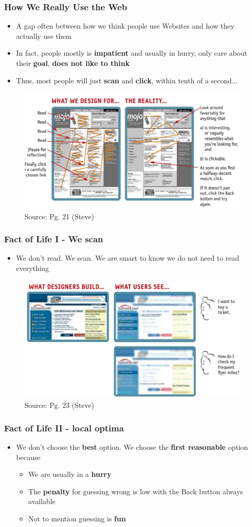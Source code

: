\documentclass{beamer}
\begin{document}
\begin{frame}
	\frametitle{How We Really Use the Web}
	\begin{itemize}
		\item A gap often between how we think people use Websites and how they actually use them
		\item In fact, people mostly is \textbf{impatient} and usually in hurry, only care about their \textbf{goal}, \textbf{does not like to think}
		\item Thus, most people will just \textbf{scan} and \textbf{click}, within tenth of a second...
	\end{itemize}
		\begin{figure}
		\includegraphics[width=0.5\linewidth]{steve/how}
		\caption{Source: Pg. 21 (Steve)}
	\end{figure}
\end{frame}

\begin{frame}
	\frametitle{Fact of Life I - We scan}
	\begin{itemize}
		\item We don't read.  We scan.  We are smart to know we do not need to read everything
	\end{itemize}
	\begin{figure}
		\includegraphics[width=0.7\linewidth]{steve/fact1}
		\caption{Source: Pg. 23 (Steve)}
	\end{figure}
\end{frame}

\begin{frame}
	\frametitle{Fact of Life II - local optima}
	\begin{itemize}
		\item We don't choose the \textbf{best} option.  We choose the \textbf{first reasonable} option because
		\begin{itemize}
			\item We are usually in a \textbf{hurry}
			\item The \textbf{penalty} for guessing wrong is low with the Back button always available
			\item Not to mention guessing is \textbf{fun} 
		\end{itemize} 
	\end{itemize}
\end{frame}
\end{document}
